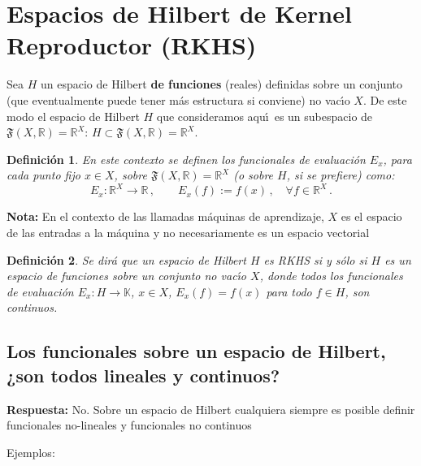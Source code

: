 \documentclass[12pt]{article}
\newtheorem*{mydef}{Definición}
\begin{document}
\section{Espacios de Hilbert de Kernel Reproductor (RKHS)}



Sea $H$ un espacio de Hilbert {\bf de funciones} (reales) definidas sobre
un conjunto (que eventualmente puede tener m\'as estructura si conviene)
no vac\'\i o $X$.
De este modo el espacio de Hilbert $H$ que consideramos aqu\'\i\
es un subespacio de $\mathfrak{F}(X,\mathbb{R})=\mathbb{R}^X$:
$H\subset\mathfrak{F}(X,\mathbb{R})=\mathbb{R}^X$.

\begin{mydef}
En este contexto se definen los funcionales de evaluaci\'on $E_x$,
para cada punto fijo $x\in X$, sobre
$\mathfrak{F}(X,\mathbb{R})=\mathbb{R}^X$
(o sobre $H$, si se prefiere) como:
$$
E_x: \mathbb{R}^X\to\mathbb{R}\,,\qquad
E_x(f):=f(x)\,,\quad\forall f\in \mathbb{R}^X\,.
$$
\end{mydef}

\textbf{Nota:} En el contexto de las llamadas m\'aquinas de aprendizaje, $X$ es el espacio de las entradas a la m\'aquina y no necesariamente es un
espacio vectorial

\begin{mydef}
Se dir\'a que un espacio de Hilbert $H$ es RKHS si y s\'olo si
$H$ es un espacio de funciones sobre un conjunto no vac\'\i o $X$, donde
todos los funcionales de evaluaci\'on $E_x:H\to\mathbb{K}$, $x\in X$, 
$E_x(f)=f(x)$ para todo $f\in H$, son continuos.
\end{mydef}

\subsection*{Los funcionales sobre un espacio de Hilbert, ¿son todos lineales y continuos?}

\textbf{Respuesta:} No. Sobre un espacio de Hilbert cualquiera siempre es posible definir funcionales no-lineales y funcionales no continuos

Ejemplos:
\end{document}
